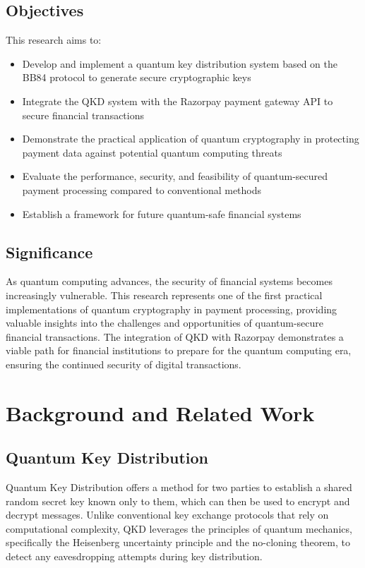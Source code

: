 \documentclass[conference]{IEEEtran}
\begin{document}
\subsection{Objectives}
This research aims to:
\begin{itemize}
    \item Develop and implement a quantum key distribution system based on the BB84 protocol to generate secure cryptographic keys
    \item Integrate the QKD system with the Razorpay payment gateway API to secure financial transactions
    \item Demonstrate the practical application of quantum cryptography in protecting payment data against potential quantum computing threats
    \item Evaluate the performance, security, and feasibility of quantum-secured payment processing compared to conventional methods
    \item Establish a framework for future quantum-safe financial systems
\end{itemize}

\subsection{Significance}
As quantum computing advances, the security of financial systems becomes increasingly vulnerable. This research represents one of the first practical implementations of quantum cryptography in payment processing, providing valuable insights into the challenges and opportunities of quantum-secure financial transactions. The integration of QKD with Razorpay demonstrates a viable path for financial institutions to prepare for the quantum computing era, ensuring the continued security of digital transactions.

\section{Background and Related Work}

\subsection{Quantum Key Distribution}
Quantum Key Distribution offers a method for two parties to establish a shared random secret key known only to them, which can then be used to encrypt and decrypt messages. Unlike conventional key exchange protocols that rely on computational complexity, QKD leverages the principles of quantum mechanics, specifically the Heisenberg uncertainty principle and the no-cloning theorem, to detect any eavesdropping attempts during key distribution.
\end{document}
